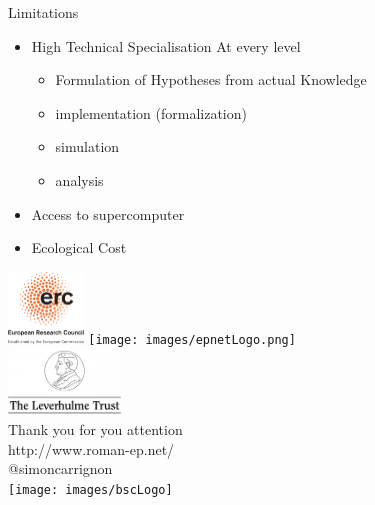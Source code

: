 \documentclass[10pt, notes=show]{beamer}
\begin{document}
\begin{frame}{Limitations}
    \begin{itemize}
        \item<+-> High Technical Specialisation At every level
            \begin{itemize}
                \item <+-> Formulation of Hypotheses from actual Knowledge
                \item <+-> implementation (formalization)
                \item <+-> simulation
                \item <+-> analysis
            \end{itemize}
        \item<+-> Access to supercomputer 
        \item<+-> Ecological Cost
    \end{itemize}
    
\end{frame}


\begin{frame}
	\begin{center}
		\includegraphics[width=2cm]{images/LOGO-ERC.jpg} \hfil	\texttt{[image: images/epnetLogo.png]}\\
		\includegraphics[width=3cm]{images/leverhulme}\\
		\vspace{.5cm}
		Thank you for you attention\\
		\vspace{.5cm}
		\scriptsize
			http://www.roman-ep.net/\\
			@simoncarrignon\\
		\vspace{.5cm}
		\texttt{[image: images/bscLogo]}\\
	\end{center}
\end{frame}
\end{document}
